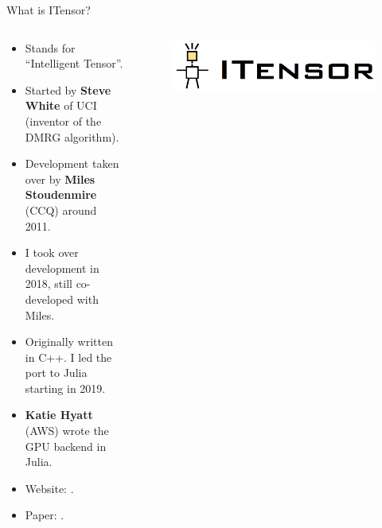 \begin{frame}{What is ITensor?}

\begin{columns}

  \begin{column}[T]{0.7\textwidth}%

    \begin{itemize}[<+->]

      \item Stands for ``Intelligent Tensor''.
      \item Started by \textbf{Steve White} of UCI (inventor of the DMRG algorithm).
      \item Development taken over by \textbf{Miles Stoudenmire} (CCQ) around 2011.
      \item I took over development in 2018, still co-developed with Miles.
      \item Originally written in C++. I led the port to Julia starting in 2019.
      \item \textbf{Katie Hyatt} (AWS) wrote the GPU backend in Julia.
      \item Website: .
      \item Paper: .

    \end{itemize}

  \end{column}

  \begin{column}[T]{0.3\textwidth}%

    \begin{figure}[T]
      \includegraphics[width=1.0\textwidth]{
        slides/assets/what-is-itensor-itensor.jpg
      }
    \end{figure}

    \begin{columns}

      \begin{column}[T]{0.5\textwidth}%


\end{column}
\end{columns}
\end{column}
\end{columns}
\end{frame}
